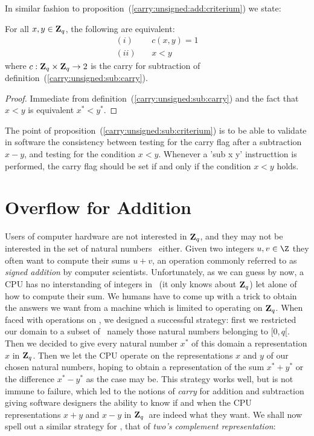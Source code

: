 \documentclass{article}
\newcommand{\zq}{\mbox{${\bf Z}_{q}$}}
\begin{document}
In similar fashion to proposition~(\ref{carry:unsigned:add:criterium}) we state:

\begin{prop}\label{carry:unsigned:sub:criterium}
  For all $x,y\in\zq$, the following are equivalent:
    \begin{eqnarray*}
      (i)&\ &c(x,y) = 1\\
      (ii)&\ & x < y
    \end{eqnarray*}
where $c:\zq\times\zq\rightarrow 2$ is the carry for subtraction of 
  definition~(\ref{carry:unsigned:sub:carry}).
\end{prop}
\begin{proof}
Immediate from definition~(\ref{carry:unsigned:sub:carry}) and the fact 
that $x<y$ is equivalent $x^{*}<y^{*}$.
\end{proof}

The point of proposition~(\ref{carry:unsigned:sub:criterium}) is to be 
able to validate in software the consistency between testing for the 
carry flag after a subtraction $x-y$, and testing for the condition $x<y$.
Whenever a 'sub x y' instructtion is performed, the carry flag should be
set if and only if the condition $x<y$ holds.

\section{Overflow for Addition}
Users of computer hardware are not interested in \zq, and they may not be
interested in the set of natural numbers \N\ either. Given two integers 
$u,v\in\Z$ they often want to compute their sums $u+v$, an operation 
commonly referred to as {\em signed addition} by computer scientists.
Unfortunately, as we can guess by now, a CPU has no interstanding of
integers in \Z\ (it only knows about \zq) let alone of how to compute
their sum. We humans have to come up with a trick to obtain the answers
we want from a machine which is limited to operating on \zq. When faced
with operations on \N, we designed a successful strategy: first we 
restricted our domain to a subset of \N\ namely those natural numbers
belonging to $[0,q[$. Then we decided to give every natural number $x^{*}$
of this domain a representation $x$ in \zq. Then we let the CPU operate
on the representations $x$ and $y$ of our chosen natural numbers, 
hoping to obtain a representation of the sum $x^{*} + y^{*}$ or the 
difference $x^{*}-y^{*}$ as the case may be. This strategy works well,
but is not immune to failure, which led to the notions of {\em carry}
for addition and subtraction giving software designers the ability
to know if and when the CPU representations $x+y$ and $x-y$ in \zq\ 
are indeed what they want. We shall now spell out a similar strategy 
for \Z, that of {\em two's complement representation}:
\end{document}
